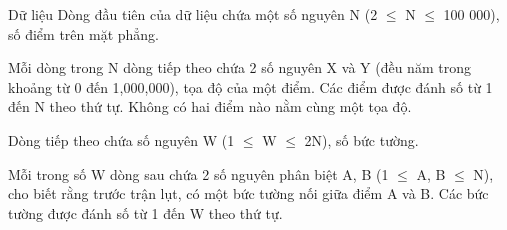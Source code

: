 Dữ liệu
Dòng đầu tiên của dữ liệu chứa một số nguyên N (2  $\le$  N  $\le$  100 000), số điểm trên mặt phẳng.  

   Mỗi dòng trong N dòng tiếp theo chứa 2 số nguyên X và Y (đều năm trong khoảng từ 0 đến 1,000,000), tọa độ của một điểm. Các điểm được đánh số từ 1 đến N theo thứ tự. Không có hai điểm nào nằm cùng một tọa độ.  

   Dòng tiếp theo chứa số nguyên W (1  $\le$  W  $\le$  2N), số bức tường.  

   Mỗi trong số W dòng sau chứa 2 số nguyên phân biệt A, B (1  $\le$  A, B  $\le$  N), cho biết rằng trước trận lụt, có một bức tường nối giữa điểm A và B. Các bức tường được đánh số từ 1 đến W theo thứ tự.